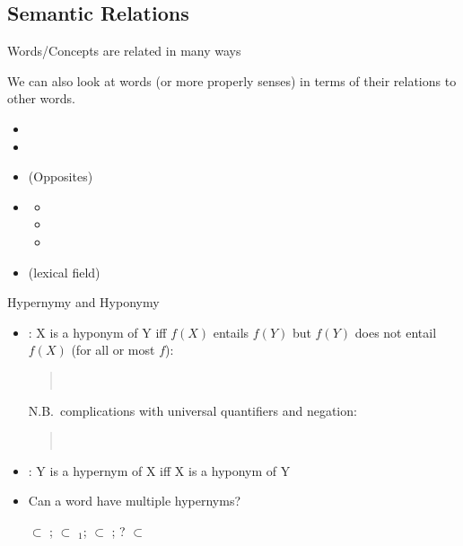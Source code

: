 \subsection*{Semantic Relations}
\begin{frame}{Words/Concepts are related in many ways}

We can also look at words (or more properly senses) in terms of their
relations to other words.

\begin{itemize}
\item {}
\item {}
\item {} (Opposites)
\item {}
    \begin{itemize}
    \item {}
    \item {}
    \item {}
    \end{itemize}
  \item {} (lexical field)
\end{itemize}




\end{frame}

\begin{frame}{Hypernymy and Hyponymy}

\begin{itemize}
\item {}: X is a hyponym of Y iff
  $f(X)$ entails $f(Y)$ but $f(Y)$ does not entail $f(X)$ (for all or most $f$):
  \begin{quote}
    \\
  \end{quote}
  N.B.\ complications with universal quantifiers and negation:
  \begin{quote}
    \\
  \end{quote}
\item {}: Y is a hypernym of X iff X is a hyponym of Y
\item Can a word have multiple hypernyms?
  \begin{exe}
    \ex {} $\subset$ ; $\subset$ $_1$; 
    $\subset$ ; ? $\subset$ 
  \end{exe}
\end{itemize}

\end{frame}


